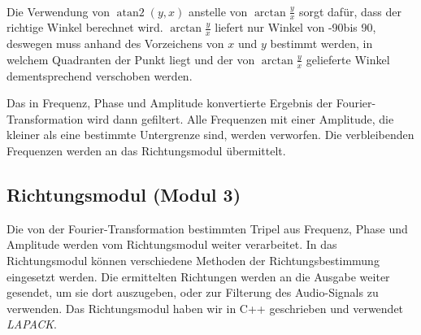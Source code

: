 \vspace{20pt}
\\
Die Verwendung von $\operatorname{atan2}(y,x)$ anstelle von $\arctan\frac{y}{x}$ sorgt dafür, dass der richtige Winkel berechnet wird. $\arctan\frac{y}{x}$ liefert nur Winkel von -90\degree bis 90\degree, deswegen muss anhand des Vorzeichens von $x$ und $y$ bestimmt werden, in welchem Quadranten der Punkt liegt und der von $\arctan\frac{y}{x}$ gelieferte Winkel dementsprechend verschoben werden.

Das in Frequenz, Phase und Amplitude konvertierte Ergebnis der Fourier-Transformation wird dann gefiltert. Alle Frequenzen mit einer Amplitude, die kleiner als eine bestimmte Untergrenze sind, werden verworfen. Die verbleibenden Frequenzen werden an das Richtungsmodul übermittelt.

\subsection{Richtungsmodul (Modul 3)}
Die von der Fourier-Transformation bestimmten Tripel aus Frequenz, Phase und Amplitude werden vom Richtungsmodul weiter verarbeitet. In das Richtungsmodul können verschiedene Methoden der Richtungsbestimmung eingesetzt werden. Die ermittelten Richtungen werden an die Ausgabe weiter gesendet, um sie dort auszugeben, oder zur Filterung des Audio-Signals zu verwenden.
Das Richtungsmodul haben wir in C++ geschrieben und verwendet \textit{LAPACK}\cite{Anderson:1990:LPL:110382.110385}.
